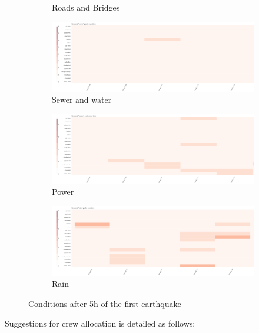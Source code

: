 \begin{figure}[!h]
\begin{subfigure}[!h]{0.32\textwidth}
        \caption{Roads and Bridges}
        \label{fig:road_5h}
    \end{subfigure}
    \begin{subfigure}[!h]{0.32\textwidth}
        \centering
        \includegraphics[width=1.00\textwidth]{figs/cond_5h/cond_5h_sewer.png}
        \caption{Sewer and water}
        \label{fig:sewer_5h}
    \end{subfigure}
    \begin{subfigure}[!h]{0.32\textwidth}
        \centering
        \includegraphics[width=1.00\textwidth]{figs/cond_5h/cond_5h_power.png}
        \caption{Power}
        \label{fig:power_5h}
    \end{subfigure}
    \begin{subfigure}[!h]{0.32\textwidth}
        \centering
        \includegraphics[width=1.00\textwidth]{figs/cond_5h/cond_5h_rain.png}
        \caption{Rain}
        \label{fig:rain_5h}
    \end{subfigure}
    \caption{Conditions after 5h of the first earthquake}
    \label{fig:eq_cond_5h}
\end{figure}

Suggestions for crew allocation is detailed as follows: 


